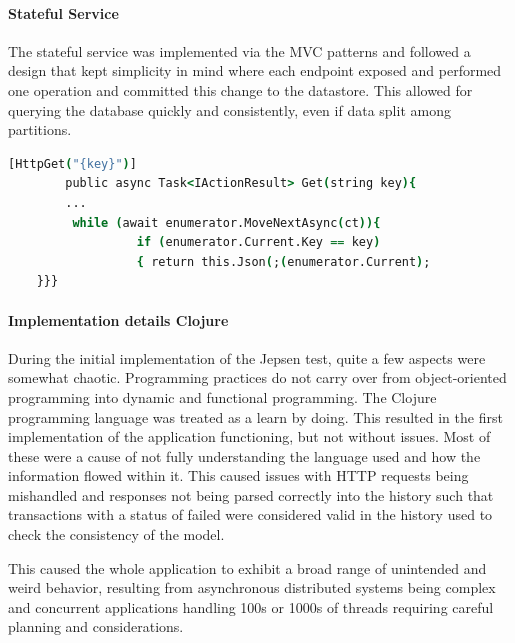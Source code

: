 \documentclass[a4paper,10pt,titlepage]{report}
\begin{document}
\paragraph*{Stateful Service}

The stateful service was implemented via the MVC patterns and followed a design that kept simplicity in mind where each endpoint exposed and performed one operation and committed this change to the datastore. This allowed for querying the database quickly and consistently, even if data split among partitions.
\begin{lstlisting}[language=csh]
        [HttpGet("{key}")]
        public async Task<IActionResult> Get(string key){
        ...
         while (await enumerator.MoveNextAsync(ct)){
                  if (enumerator.Current.Key == key)
                  { return this.Json(;(enumerator.Current);
    }}}
\end{lstlisting}   

\paragraph*{Implementation details Clojure}
During the initial implementation of the Jepsen test, quite a few aspects were somewhat chaotic. Programming practices do not carry over from object-oriented programming into dynamic and functional programming. The Clojure programming language was treated as a learn by doing. This resulted in the first implementation of the application functioning, but not without issues. Most of these were a cause of not fully understanding the language used and how the information flowed within it. This caused issues with HTTP requests being mishandled and responses not being parsed correctly into the history such that transactions with a status of failed were considered valid in the history used to check the consistency of the model.
 
This caused the whole application to exhibit a broad range of unintended and weird behavior, resulting from asynchronous distributed systems being complex and concurrent applications handling 100s or 1000s of threads requiring careful planning and considerations.
       
\end{document}
